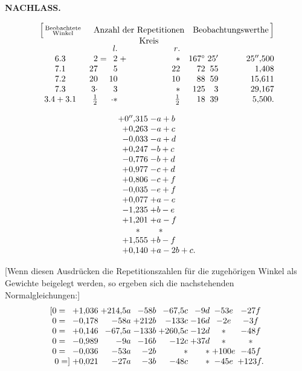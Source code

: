 \par\clearpage
\noindent{}\hfill{\small\textbf{NACHLASS.}}\hfill\null\par\medskip
{\small
\[
\begin{array}{@{}c@{\quad}r@{\;}c@{\;}r@{\;}c@{\;}r@{\quad}r@{\;}r@{\;}r@{}}
 \Bigl[\,\substack{\text{Beobachtete}\\\text{Winkel}}&
 \multicolumn{5}{c}{\text{Anzahl der Repetitionen}}&
 \multicolumn{3}{c@{}}{\text{Beobachtungswerthe}\,\Bigr]}\\[-2pt]
 &&&\multicolumn{3}{c}{\text{Kreis}}&&&\\[-3pt]
 &&&\mathit{l.}&&\mathit{r.}&&&\\
 6.3&2&=&2&+&\ast&167^\circ&25'&25''{,}500\\
 7.1&27&&5&&22&72&55&1{,}408\\
 7.2&20&&10&&10&88&59&15{,}611\\
 7.3&3\mathord{\cdot}&&3&&\ast&125&3&29{,}167\\
 3.4+3.1&\frac12&&\mathord{\raisebox{.4ex}{.}}\ast&&\frac12&18&39&5{,}500.
\end{array}
\]
}

{\par}
\[
\begin{array}{@{}r@{\;}l@{}}
 +0''{,}315&-a+b\\
 +0{,}263&-a+c\\
 -0{,}033&-a+d\\
 +0{,}247&-b+c\\
 -0{,}776&-b+d\\
 +0{,}977&-c+d\\
 +0{,}806&-c+f\\
 -0{,}035&-e+f\\
 +0{,}077&+a-e\\
 -1{,}235&+b-e\\
 +1{,}201&+a-f\\
 \makebox[2.4em][c]{\(\ast\)}&\quad\ast\\
 +1{,}555&+b-f\\
 +0{,}140&+a-2b+c.
\end{array}
\]

[Wenn diesen Ausdrücken die Repetitionszahlen für die zugehörigen Winkel als Gewichte beigelegt werden, so ergeben sich die nachstehenden Normalgleichungen:]
\[
\begin{array}{@{}r@{\;}r@{\;}r@{\;}r@{\;}r@{\;}r@{\;}c@{\;}c@{}}
 [0=\phantom{]}&+1{,}036&+214{,}5a&-58b&-67{,}5c&-9d&-53e&-27f\\
 0=\phantom{]}&-0{,}178&-58a&+212b&-133c&-16d&-2e&-3f\\
 0=\phantom{]}&+0{,}146&-67{,}5a&-133b&+260{,}5c&-12d&\ast&-48f\\
 0=\phantom{]}&-0{,}989&-9a&-16b&-12c&+37d&\ast&\ast\\
 0=\phantom{]}&-0{,}036&-53a&-2b&\ast&\ast&+100e&-45f\\
 0=]&+0{,}021&-27a&-3b&-48c&\ast&-45e&+123f.
\end{array}
\]

